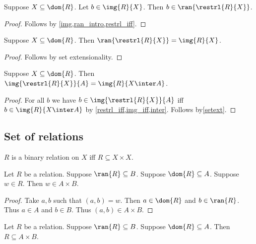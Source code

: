 \begin{proposition}\label{restrl_ran_intro}
    Suppose $X\subseteq\dom{R}$.
    Let $b\in\img{R}{X}$.
    Then $b\in\ran{\restrl{R}{X}}$.
\end{proposition}
\begin{proof}
    Follows by \cref{img,ran_intro,restrl_iff}.
\end{proof}

\begin{proposition}\label{restrl_ran}
    Suppose $X\subseteq\dom{R}$.
    Then $\ran{\restrl{R}{X}} = \img{R}{X}$.
\end{proposition}
\begin{proof}
    Follows by set extensionality.
\end{proof}

\begin{proposition}\label{restrl_img}
    Suppose $X\subseteq\dom{R}$.
    Then $\img{\restrl{R}{X}}{A} = \img{R}{X\inter A}$.
\end{proposition}
\begin{proof}
    For all $b$ we have $b\in\img{\restrl{R}{X}}{A}$ iff $b\in \img{R}{X\inter A}$
        by \cref{restrl_iff,img_iff,inter}.
    Follows by\cref{setext}.
\end{proof}



\subsection{Set of relations}

\begin{abbreviation}\label{binary_relation_on}
    $R$ is a binary relation on $X$ iff $R\subseteq X\times X$.
\end{abbreviation}

\begin{proposition}\label{relation_subseteq_intro_elem}
    Let $R$ be a relation.
    Suppose $\ran{R}\subseteq B$.
    Suppose $\dom{R}\subseteq A$.
    Suppose $w\in R$.
    Then $w\in A\times B$.
\end{proposition}
\begin{proof}
    Take $a, b$ such that $(a, b) = w$.
    Then $a\in\dom{R}$ and $b\in\ran{R}$.
    Thus $a\in A$ and $b\in B$.
    Thus $(a, b)\in A\times B$.
\end{proof}

\begin{proposition}\label{relation_subseteq_intro}
    Let $R$ be a relation.
    Suppose $\ran{R}\subseteq B$.
    Suppose $\dom{R}\subseteq A$.
    Then $R\subseteq A\times B$.
\end{proposition}

